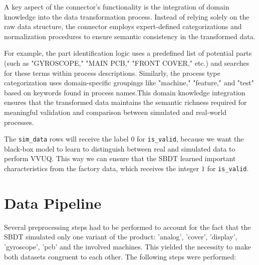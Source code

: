 A key aspect of the connector's functionality is the integration of domain knowledge into the data transformation process. Instead of relying solely on the raw data structure, the connector employs expert-defined categorizations and normalization procedures to ensure semantic consistency in the transformed data.

For example, the part identification logic uses a predefined list of potential parts (such as "GYROSCOPE," "MAIN PCB," "FRONT COVER," etc.) and searches for these terms within process descriptions. Similarly, the process type categorization uses domain-specific groupings like "machine," "feature," and "test" based on keywords found in process names.This domain knowledge integration ensures that the transformed data maintains the semantic richness required for meaningful validation and comparison between simulated and real-world processes.

The \texttt{sim\_data} rows will receive the label $0$ for \texttt{is\_valid}, because we want the black-box model to learn to distinguish between real and simulated data to perform VVUQ. This way we can ensure that the SBDT learned important characteristics from the factory data, which receives the integer $1$ for \texttt{is\_valid}.


\section{Data Pipeline}
\label{sec:data-pipeline}

Several preprocessing steps had to be performed to account for the fact that the SBDT simulated only one variant of the product: 'analog', 'cover', 'display', 'gyroscope', 'pcb' and the involved machines. This yielded the necessity to make both datasets congruent to each other. The following steps were performed:

